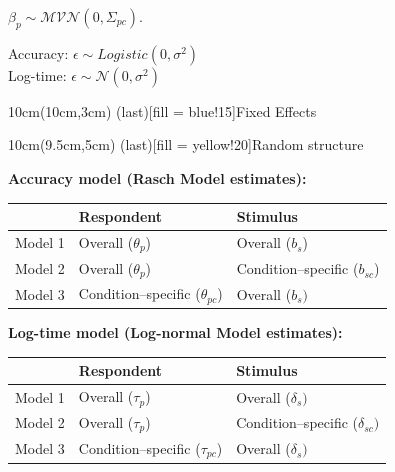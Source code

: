 \documentclass{beamer}
\begin{document}
\begin{frame}
\begin{centering}
	\end{centering}
	
	\begin{centering}
		
		$\beta_p \sim \mathcal{MVN}(0, \Sigma_{pc})$.
		
	\end{centering}
	
	
	\vspace{3mm}
	
	\footnotesize{Accuracy: $\epsilon \sim Logistic (0, \sigma^2)$ \\ Log-time: $\epsilon \sim \mathcal{N} (0, \sigma^2)$}
	
	
	
	\begin{textblock*}{10cm}(10cm,3cm)
		\spot(last)[fill = blue!15]{Fixed Effects}
	\end{textblock*}
	\begin{textblock*}{10cm}(9.5cm,5cm)
		\spot(last)[fill = yellow!20]{Random structure}
	\end{textblock*}
\end{frame}

\begin{frame}
	\vspace{5mm}
	{\textcolor{rasch}{\large{\textbf{Accuracy model (Rasch Model estimates):}}}}
	\vspace{2mm}
	\begin{table}
		\centering
		\begin{tabular}{l l l}
			\hline
			& \textbf{Respondent} & \textbf{Stimulus}\\
			\hline				
			
			Model 1  & 	 Overall ($\theta_p$) & Overall ($b_s$) \\		
			Model 2 & Overall ($\theta_p$) & Condition--specific ($b_{sc}$)\\
			Model 3 &Condition--specific ($\theta_{pc}$)  & Overall ($b_s)$ \\
			\hline
		\end{tabular}
	\end{table}
	
	\vspace{3mm}
	{\textcolor{log}{\large{\textbf{Log-time model (Log-normal Model estimates):}}}}
	\vspace{2mm}
	\begin{table}
		\centering
		\begin{tabular}{l l l}
			\hline
			& \textbf{Respondent} & \textbf{Stimulus}\\
			\hline					 
			Model 1  & Overall  ($\tau_p$) & Overall ($\delta_s)$ \\	
			Model 2 & Overall ($\tau_p$) & Condition--specific ($\delta_{sc})$ \\
			Model 3 & Condition--specific ($\tau_{pc}$) & Overall ($\delta_s)$ \\
			\hline
		\end{tabular}
	\end{table}
\end{frame}
\end{document}
